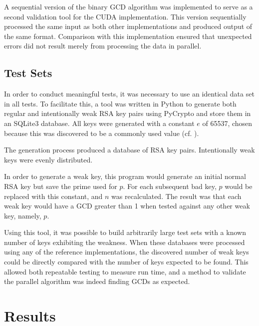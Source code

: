 \documentclass[12pt]{ucthesis}
\begin{document}
A sequential version of the binary GCD algorithm was implemented to serve as a 
second validation tool for the CUDA implementation. This version sequentially 
processed the same input as both other implementations and produced output of
the same format. Comparison with this implementation ensured that unexpected
errors did not result merely from processing the data in parallel.

\section{Test Sets}
\label{subsec:testsets}
In order to conduct meaningful tests, it was necessary to use an identical 
data set in all tests. To facilitate this, a tool was written in Python to 
generate both regular and intentionally weak RSA key pairs using PyCrypto and
store them in an SQLite3 database. All keys were generated with a 
constant $e$ of 65537, chosen because this was discovered to be a commonly used 
value (cf. \cite{lenstra2012ron}).

The generation process produced a database of RSA key pairs. 
Intentionally weak keys were evenly distributed. 

In order to generate a weak key, this program would generate an initial 
normal RSA key but save the prime used for $p$. For each subsequent bad key, 
$p$ would be replaced with this constant, and $n$ was recalculated. The 
result was that each weak key would have a GCD greater than 1 when 
tested against any other weak key, namely, $p$. 

Using this tool, it was possible to build arbitrarily large test sets with a 
known number of keys exhibiting the weakness. When these databases 
were processed using any of the reference implementations, the 
discovered number of weak keys could be directly compared with the 
number of keys expected to be found. This allowed both repeatable testing to 
measure run time, and a method to validate the parallel algorithm was indeed 
finding GCDs as expected. 


\chapter{Results}
\label{sec:results}
\end{document}
